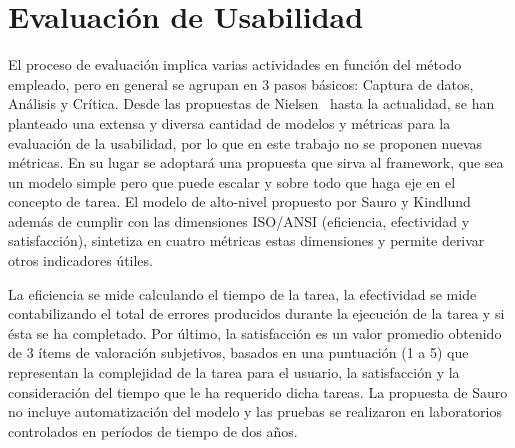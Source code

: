 \section{Evaluación de Usabilidad}
\label{sec:eval_usabilidad}

El  proceso de evaluación implica varias actividades en función del método empleado, pero en general se agrupan en 3 pasos básicos: Captura de datos, Análisis y Crítica.
Desde las propuestas de Nielsen~\cite{NIELSEN1992} hasta la actualidad, se han planteado una extensa y diversa cantidad de modelos y métricas para la evaluación de la usabilidad, por lo que en este trabajo no se proponen nuevas métricas. En su lugar se adoptará una propuesta que sirva al framework, que sea un modelo simple pero que puede escalar y sobre todo que haga eje en el concepto de tarea. El modelo de alto-nivel propuesto por Sauro y Kindlund~\cite{SK2005} además de cumplir con las dimensiones ISO/ANSI (eficiencia, efectividad y satisfacción), sintetiza en cuatro métricas estas dimensiones y permite derivar otros indicadores útiles.%

La eficiencia se mide calculando el tiempo de la tarea, la efectividad se mide contabilizando el total de errores producidos durante la ejecución de la tarea y si ésta se ha completado. Por último, la satisfacción es un valor promedio obtenido de 3 ítems de valoración subjetivos, basados en una puntuación (1 a 5) que representan la complejidad de la tarea para el usuario, la satisfacción y la consideración del tiempo que le ha requerido dicha tareas. 
La propuesta de Sauro no incluye automatización del modelo y las pruebas se realizaron en laboratorios controlados en períodos de tiempo de dos años. 
